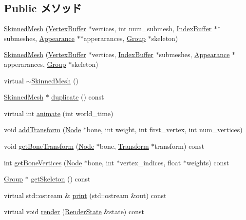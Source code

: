 \subsection*{Public メソッド}
\begin{CompactItemize}
\item 
\hyperlink{classm3g_1_1SkinnedMesh_277419d6851b0e305f66a46095269915}{SkinnedMesh} (\hyperlink{classm3g_1_1VertexBuffer}{VertexBuffer} $\ast$vertices, int num\_\-submesh, \hyperlink{classm3g_1_1IndexBuffer}{IndexBuffer} $\ast$$\ast$submeshes, \hyperlink{classm3g_1_1Appearance}{Appearance} $\ast$$\ast$apperarances, \hyperlink{classm3g_1_1Group}{Group} $\ast$skeleton)
\item 
\hyperlink{classm3g_1_1SkinnedMesh_094bf88089897beeb8b8776e3bbb299d}{SkinnedMesh} (\hyperlink{classm3g_1_1VertexBuffer}{VertexBuffer} $\ast$vertices, \hyperlink{classm3g_1_1IndexBuffer}{IndexBuffer} $\ast$submeshes, \hyperlink{classm3g_1_1Appearance}{Appearance} $\ast$apperarances, \hyperlink{classm3g_1_1Group}{Group} $\ast$skeleton)
\item 
virtual \hyperlink{classm3g_1_1SkinnedMesh_c73da5b5c5f8f14fc241328b4b78928c}{$\sim$SkinnedMesh} ()
\item 
\hyperlink{classm3g_1_1SkinnedMesh}{SkinnedMesh} $\ast$ \hyperlink{classm3g_1_1SkinnedMesh_d3f422cf7656b73687d789094c7eae42}{duplicate} () const 
\item 
virtual int \hyperlink{classm3g_1_1SkinnedMesh_8aad1ceab4c2a03609c8a42324ce484d}{animate} (int world\_\-time)
\item 
void \hyperlink{classm3g_1_1SkinnedMesh_05077c4ee16f87ed4163f4d7a5f4f735}{addTransform} (\hyperlink{classm3g_1_1Node}{Node} $\ast$bone, int weight, int first\_\-vertex, int num\_\-vertices)
\item 
void \hyperlink{classm3g_1_1SkinnedMesh_e6c2fed8109053ded845e49f5c3b0c73}{getBoneTransform} (\hyperlink{classm3g_1_1Node}{Node} $\ast$bone, \hyperlink{classm3g_1_1Transform}{Transform} $\ast$transform) const 
\item 
int \hyperlink{classm3g_1_1SkinnedMesh_84ec0935b92b7ccc0aed7e66c4eac78f}{getBoneVertices} (\hyperlink{classm3g_1_1Node}{Node} $\ast$bone, int $\ast$vertex\_\-indices, float $\ast$weights) const 
\item 
\hyperlink{classm3g_1_1Group}{Group} $\ast$ \hyperlink{classm3g_1_1SkinnedMesh_ce7d69c2b600f6f01a46214db28e6f92}{getSkeleton} () const 
\item 
virtual std::ostream \& \hyperlink{classm3g_1_1SkinnedMesh_6fea17fa1532df3794f8cb39cb4f911f}{print} (std::ostream \&out) const 
\item 
virtual void \hyperlink{classm3g_1_1SkinnedMesh_8babc8a79b78615da51161e94029eea9}{render} (\hyperlink{structm3g_1_1RenderState}{RenderState} \&state) const 
\end{CompactItemize}


